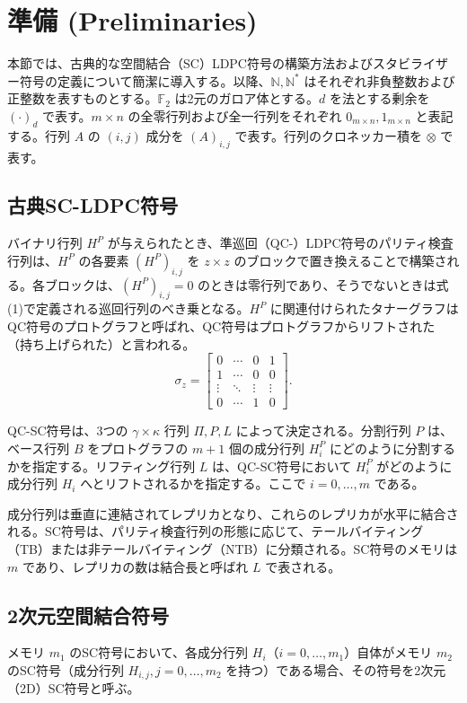 \documentclass[a4paper,11pt]{article}
\begin{document}
\section{準備 (Preliminaries)}
本節では、古典的な空間結合（SC）LDPC符号の構築方法およびスタビライザー符号の定義について簡潔に導入する。以降、$\mathbb{N}, \mathbb{N}^*$ はそれぞれ非負整数および正整数を表すものとする。$\mathbb{F}_2$ は2元のガロア体とする。$d$ を法とする剰余を $(\cdot)_d$ で表す。$m \times n$ の全零行列および全一行列をそれぞれ $0_{m \times n}, 1_{m \times n}$ と表記する。行列 $A$ の $(i,j)$ 成分を $(A)_{i,j}$ で表す。行列のクロネッカー積を $\otimes$ で表す。

\subsection{古典SC-LDPC符号}
バイナリ行列 $H^P$ が与えられたとき、準巡回（QC-）LDPC符号のパリティ検査行列は、$H^P$ の各要素 $(H^P)_{i,j}$ を $z \times z$ のブロックで置き換えることで構築される。各ブロックは、$(H^P)_{i,j}=0$ のときは零行列であり、そうでないときは式(1)で定義される巡回行列のべき乗となる。$H^P$ に関連付けられたタナーグラフはQC符号のプロトグラフと呼ばれ、QC符号はプロトグラフからリフトされた（持ち上げられた）と言われる。
\begin{equation}
\sigma_{z}=\begin{bmatrix}0 & \cdots & 0 & 1 \\ 1 & \cdots & 0 & 0 \\ \vdots & \ddots & \vdots & \vdots \\ 0 & \cdots & 1 & 0\end{bmatrix}.
\end{equation}

QC-SC符号は、3つの $\gamma \times \kappa$ 行列 $\Pi, P, L$ によって決定される。分割行列 $P$ は、ベース行列 $B$ をプロトグラフの $m+1$ 個の成分行列 $H_i^P$ にどのように分割するかを指定する。リフティング行列 $L$ は、QC-SC符号において $H_i^P$ がどのように成分行列 $H_i$ へとリフトされるかを指定する。ここで $i=0, \dots, m$ である。

成分行列は垂直に連結されてレプリカとなり、これらのレプリカが水平に結合される。SC符号は、パリティ検査行列の形態に応じて、テールバイティング（TB）または非テールバイティング（NTB）に分類される。SC符号のメモリは $m$ であり、レプリカの数は結合長と呼ばれ $L$ で表される。

\subsection{2次元空間結合符号}
メモリ $m_1$ のSC符号において、各成分行列 $H_i$（$i=0, \dots, m_1$）自体がメモリ $m_2$ のSC符号（成分行列 $H_{i,j}, j=0, \dots, m_2$ を持つ）である場合、その符号を2次元（2D）SC符号と呼ぶ。
\end{document}
